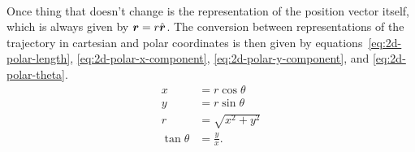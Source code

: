 \documentclass[../classical_mechanics.tex]{subfiles}
\begin{document}
        \paragraph{}
        Once thing that doesn't change is the representation of the position vector itself, which is always given by $\boldsymbol{r}=r\hat{\boldsymbol{r}}$.
        The conversion between representations of the trajectory in cartesian and polar coordinates is then given by equations~\ref{eq:2d-polar-length}, \ref{eq:2d-polar-x-component}, \ref{eq:2d-polar-y-component}, and \ref{eq:2d-polar-theta}.
        \begin{align}
            x&=r\cos\theta\\
            y&=r\sin\theta\\
            r&=\sqrt{x^2+y^2}\\
            \tan\theta&=\frac{y}{x}.
        \end{align}
\end{document}
